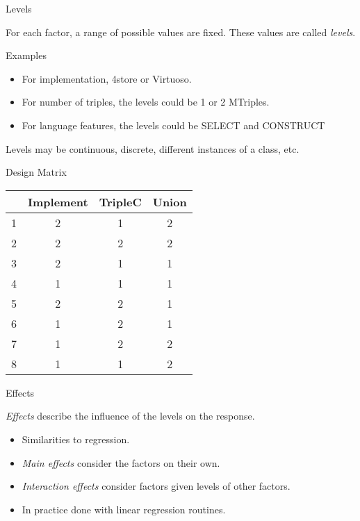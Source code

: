 \documentclass[english,usenames,dvipsnames,aspectratio=169]{beamer}
\begin{document}
\begin{frame}{Levels}

\Large
For each factor, a range of possible values are fixed. These values
are called \emph{levels}.
\normalsize

\begin{block}{Examples}
  \begin{itemize}
  \item For implementation, 4store or Virtuoso.
  \item For number of triples, the levels could be 1 or 2 MTriples.
  \item For language features, the levels could be \textsf{SELECT} and \textsf{CONSTRUCT}
  \end{itemize}
\end{block}
Levels may be continuous, discrete, different instances of a
class, etc.

\end{frame}

\begin{frame}{Design Matrix}

\begin{table}[ht]
\begin{center}
\begin{tabular}{r|ccc}
  \hline
 & Implement & TripleC & Union \\ 
  \hline
1 & 2 & 1 & 2 \\ 
  2 & 2 & 2 & 2 \\ 
  3 & 2 & 1 & 1 \\ 
  4 & 1 & 1 & 1 \\ 
  5 & 2 & 2 & 1 \\ 
  6 & 1 & 2 & 1 \\ 
  7 & 1 & 2 & 2 \\ 
  8 & 1 & 1 & 2 \\ 
   \hline
\end{tabular}
\end{center}
\end{table}


\end{frame}

\begin{frame}{Effects}

\Large
\emph{Effects} describe the influence of the levels on the response.
\normalsize

\begin{itemize}
\item Similarities to regression.
\item \emph{Main effects} consider the factors on their own.
\item \emph{Interaction effects} consider factors given levels of
  other factors.
\item In practice done with linear regression routines.
\end{itemize}

\end{frame}
\end{document}
